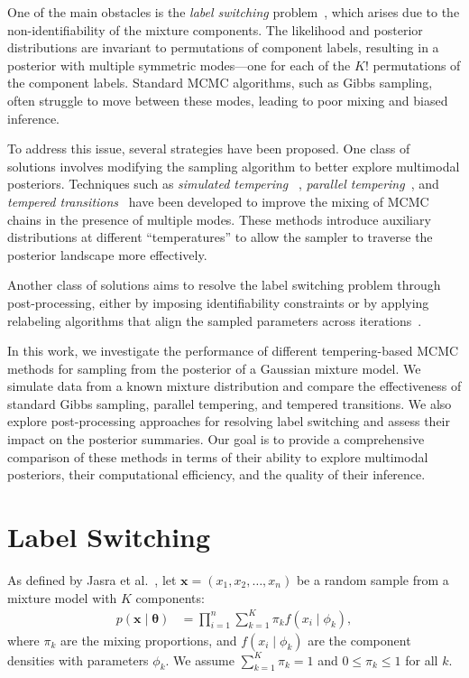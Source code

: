 \documentclass[11pt]{article}
\newcommand{\bx}{\boldsymbol{x}}
\newcommand{\btheta}{\boldsymbol{\theta}}
\begin{document}
One of the main obstacles is the \textit{label switching} problem~\citep{stephens2002dealing}, which arises due to the non-identifiability of 
the mixture components. The likelihood and posterior distributions are invariant to permutations of component 
labels, resulting in a posterior with multiple symmetric modes---one for each of the $K!$ permutations of the 
component labels. Standard MCMC algorithms, such as Gibbs sampling, often struggle to move between these modes, 
leading to poor mixing and biased inference. 

To address this issue, several strategies have been proposed. One class of solutions involves modifying the 
sampling algorithm to better explore multimodal posteriors. Techniques such as \textit{simulated tempering}~
\citep{geyer1995annealing}, \textit{parallel tempering}~\citep{earl2005parallel}, and 
\textit{tempered transitions}~\citep{neal1996sampling} have been developed to improve the mixing of MCMC 
chains in the presence of multiple modes. These methods introduce auxiliary distributions at different 
``temperatures'' to allow the sampler to traverse the posterior landscape more effectively.

Another class of solutions aims to resolve the label switching problem through post-processing, either by imposing 
identifiability constraints or by applying relabeling algorithms that align the sampled parameters across 
iterations~\citep{jasra2005labelswitching}.

In this work, we investigate the performance of different tempering-based MCMC methods for sampling from the 
posterior of a Gaussian mixture model. We simulate data from a known mixture distribution and compare the 
effectiveness of standard Gibbs sampling, parallel tempering, and tempered transitions. We also explore 
post-processing approaches for resolving label switching and assess their impact on the posterior summaries. Our 
goal is to provide a comprehensive comparison of these methods in terms of their ability to explore multimodal 
posteriors, their computational efficiency, and the quality of their inference.


\section{Label Switching}

As defined by Jasra et al.~\citep{jasra2005labelswitching}, let $\bx = (x_1, x_2, \ldots, x_n)$ be 
a random sample from a mixture model with $K$ components:
\begin{align*}
    p(\bx \mid \btheta) &= \prod_{i=1}^n \sum_{k=1}^{K} \pi_k f(x_i \mid \phi_k),
\end{align*}
where $\pi_k$ are the mixing proportions, and $f(x_i \mid \phi_k)$ are the component densities with 
parameters $\phi_k$. We assume $\sum_{k=1}^{K} \pi_k = 1$ and $0 \leq \pi_k \leq 1$ for all $k$.
\end{document}
